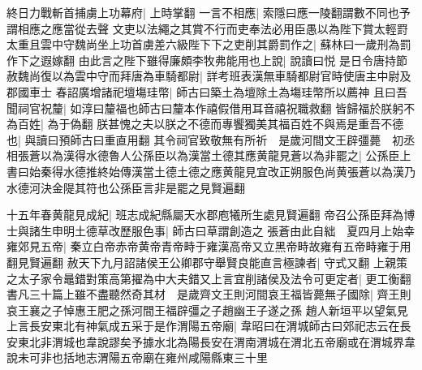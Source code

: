 終日力戰斬首捕虜上功幕府|{
	上時掌翻}
一言不相應|{
	索隱曰應一陵翻謂數不同也予謂相應之應當從去聲}
文吏以法繩之其賞不行而吏奉法必用臣愚以為陛下賞太輕罸太重且雲中守魏尚坐上功首虜差六級陛下下之吏削其爵罰作之|{
	蘇林曰一歲刑為罰作下之遐嫁翻}
由此言之陛下雖得廉頗李牧弗能用也上說|{
	說讀曰悦}
是日令唐持節赦魏尚復以為雲中守而拜唐為車騎都尉|{
	詳考班表漢無車騎都尉官時使唐主中尉及郡國車士}
春詔廣增諸祀壇塲珪幣|{
	師古曰築土為壇除土為塲珪幣所以薦神}
且曰吾聞祠官祝釐|{
	如淳曰釐福也師古曰釐本作禧假借用耳音禧祝職救翻}
皆歸福於朕躬不為百姓|{
	為于偽翻}
朕甚愧之夫以朕之不德而專饗獨美其福百姓不與焉是重吾不德也|{
	與讀曰預師古曰重直用翻}
其令祠官致敬無有所祈　是歲河間文王辟彊薨　初丞相張蒼以為漢得水德魯人公孫臣以為漢當土德其應黄龍見蒼以為非罷之|{
	公孫臣上書曰始秦得水德推終始傳漢當土德土德之應黄龍見宜改正朔服色尚黄張蒼以為漢乃水德河決金隄其符也公孫臣言非是罷之見賢遍翻}


十五年春黄龍見成紀|{
	班志成紀縣屬天水郡庖犧所生處見賢遍翻}
帝召公孫臣拜為博士與諸生申明土德草改歷服色事|{
	師古曰草謂創造之}
張蒼由此自絀　夏四月上始幸雍郊見五帝|{
	秦立白帝赤帝黄帝青帝畤于雍漢高帝又立黑帝畤故雍有五帝畤雍于用翻見賢遍翻}
赦天下九月詔諸侯王公卿郡守舉賢良能直言極諫者|{
	守式又翻}
上親策之太子家令鼂錯對策高第擢為中大夫錯又上言宜削諸侯及法令可更定者|{
	更工衡翻}
書凡三十篇上雖不盡聽然奇其材　是歲齊文王則河間哀王福皆薨無子國除|{
	齊王則哀王襄之子悼惠王肥之孫河間王福辟彊之子趙幽王子遂之孫}
趙人新垣平以望氣見上言長安東北有神氣成五采于是作渭陽五帝廟|{
	韋昭曰在渭城師古曰郊祀志云在長安東北非渭城也韋說謬矣予據水北為陽長安在渭南渭城在渭北五帝廟或在渭城界韋說未可非也括地志渭陽五帝廟在雍州咸陽縣東三十里}


